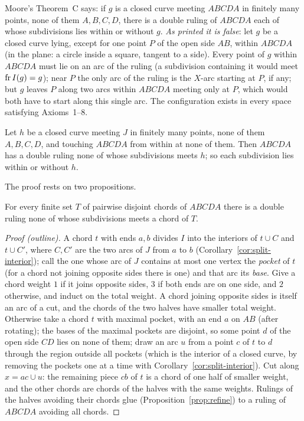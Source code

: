Moore's Theorem~C says: if $g$ is a closed curve meeting $ABCDA$ in finitely many points, none of them $A,B,C,D$, there is a double
ruling of $ABCDA$ each of whose subdivisions lies within or without $g$. \emph{As printed it is false}: let $g$ be a closed curve lying,
except for one point $P$ of the open side $AB$, within $ABCDA$ (in the plane: a circle inside a square, tangent to a side). Every point
of $g$ within $ABCDA$ must lie on an arc of the ruling (a subdivision containing it would meet $\operatorname{fr} I(g)=g$); near $P$ the only arc of
the ruling is the $X$-arc starting at $P$, if any; but $g$ leaves $P$ along two arcs within $ABCDA$ meeting only at $P$, which would both
have to start along this single arc. The configuration exists in every space satisfying Axioms~1--8.


\begin{theorem}\label{thm:theoremC}
Let $h$ be a closed curve meeting $J$ in finitely many points, none of them $A,B,C,D$, and touching $ABCDA$ from within at none of
them. Then $ABCDA$ has a double ruling none of whose subdivisions meets $h$; so each subdivision lies within or without $h$.
\end{theorem}

The proof rests on two propositions.

\begin{proposition}[Chords]\label{prop:chords-rulable}
For every finite set $T$ of pairwise disjoint chords of $ABCDA$ there is a double ruling none of whose subdivisions meets a chord of $T$.
\end{proposition}

\begin{proof}[Proof (outline)]
A chord $t$ with ends $a,b$ divides $I$ into the interiors of $t\cup C$ and $t\cup C'$, where $C,C'$ are the two arcs of $J$ from $a$ to
$b$ (Corollary~\ref{cor:split-interior}); call the one whose arc of $J$ contains at most one vertex the \emph{pocket} of $t$ (for a chord
not joining opposite sides there is one) and that arc its \emph{base}. Give a chord weight $1$ if it joins opposite sides, $3$ if both
ends are on one side, and $2$ otherwise, and induct on the total weight. A chord joining opposite sides is itself an arc of a cut, and
the chords of the two halves have smaller total weight. Otherwise take a chord $t$ with maximal pocket, with an end $a$ on $AB$ (after
rotating); the bases of the maximal pockets are disjoint, so some point $d$ of the open side $CD$ lies on none of them; draw an arc $u$
from a point $c$ of $t$ to $d$ through the region outside all pockets (which is the interior of a closed curve, by removing the pockets
one at a time with Corollary~\ref{cor:split-interior}). Cut along $x=ac\cup u$: the remaining piece $cb$ of $t$ is a chord of one half of
smaller weight, and the other chords are chords of the halves with the same weights. Rulings of the halves avoiding their chords glue
(Proposition~\ref{prop:refine}) to a ruling of $ABCDA$ avoiding all chords.
\end{proof}

